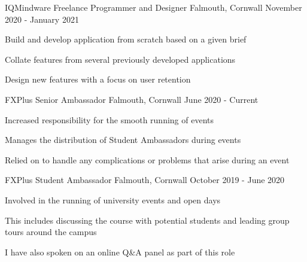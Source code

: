 

\begin{cventries}
    \cventry
        {IQMindware}
        {Freelance Programmer and Designer}
        {Falmouth, Cornwall}
        {November 2020 - January 2021}
        {
            \begin{cvitems}
                \item Build and develop application from scratch based on a given brief
                \item Collate features from several previously developed applications 
                \item Design new features with a focus on user retention
            \end{cvitems}
        }

    \cventry
        {FXPlus}
        {Senior Ambassador}
        {Falmouth, Cornwall}
        {June 2020 - Current}
        {
            \begin{cvitems}
                \item Increased responsibility for the smooth running of events
                \item Manages the distribution of Student Ambassadors during events
                \item Relied on to handle any complications or problems that arise during an event
            \end{cvitems}
        }

    \cventry
        {FXPlus}
        {Student Ambassador}
        {Falmouth, Cornwall}
        {October 2019 - June 2020}
        {
            \begin{cvitems}
                \item Involved in the running of university events and open days
                \item This includes discussing the course with potential students and leading group tours around the campus
                \item I have also spoken on an online Q\&A panel as part of this role
            \end{cvitems}
        }     
\end{cventries}